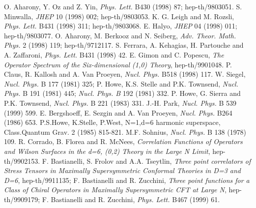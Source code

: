 \documentclass[a4paper,12pt]{article}
\begin{document}
\begin{thebibliography}{99}
 O. Aharony, Y. Oz and Z. Yin, {\it  Phys. Lett.} 
B430 (1998) 87; hep-th/9803051. 
 S. Minwalla, {\it JHEP} 10 (1998) 002; hep-th/9803053. 
 K. G. Leigh and M. Rozsli, {\it  Phys. Lett.} 
B431 (1998) 311; hep-th/9803068. 
 E. Halyo, {\it JHEP} 04 (1998) 011; hep-th/9803077.
 O. Aharony, M. Berkooz and N. Seiberg, 
{\it  Adv. Theor. Math. Phys.} 2 (1998) 119; hep-th/9712117. 
  S. Ferrara, A. Kehagias, H. Partouche and A. Zaffaroni, 
{\it  Phys. Lett.} B431 (1998) 42. 
 E. Gimon and C. Popescu, {\it  The Operator Spectrum of the 
Six-dimensional (1,0) Theory}, hep-th/9901048.
P. Claus, R. Kallosh and A. Van Proeyen, {\it Nucl. Phys.} B518 
(1998) 117. 
 W. Siegel, {\it Nucl. Phys.} B 177 (1981) 325; 
P. Howe, K.S. Stelle and P.K. Townsend, {\it Nucl. Phys.} B 191 
(1981) 445; {\it Nucl. Phys. B} 192 (1981) 332. 
 P. Howe, G. Sierra and P.K. Townsend, {\it Nucl. Phys.} B 221 
(1983) 331.
 J.-H. Park, {\it Nucl. Phys.} B 539 (1999) 599.
 E. Bergshoeff, E. Sezgin and A. Van Proeyen, {\it Nucl. Phys.} B264 
(1986) 653.
P.S.Howe, K.Stelle, P.West, N=1,d=6 harmonic superspace, 
Class.Quantum Grav. 2 (1985) 815-821. 
 M.F. Sohnius, {\it Nucl. Phys.}  B 138 (1978) 109.
 R. Corrado, B. Florea and R. McNees, {\it  Correlation Functions 
of Operators and Wilson Surfaces in the d=6, (0,2) Theory in the Large N Limit}, 
hep-th/9902153.
 F. Bastianelli, S. Frolov and A.A. Tseytlin, {\it Three point
correlators of Stress Tensors in Maximally Supersymmetric Conformal Theories 
in D=3 and D=6}, hep-th/9911135; F. Bastianelli and R. Zucchini, {\it Three point
functions for a Class of Chiral Operators in Maximally Supersymmetric CFT at Large
N}, hep-th/9909179; F. Bastianelli and R. Zucchini, {\it Phys. Lett.} B467 (1999)
61.

\end{thebibliography}
\end{document}
